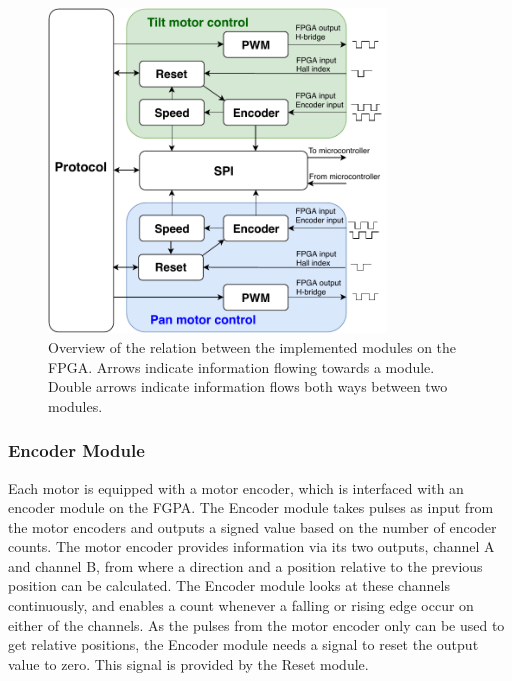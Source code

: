 \documentclass[../../main.tex]{subfiles}
\begin{document}
\begin{figure}
    \centering
    \includegraphics[width=0.8\textwidth]{Sections/System_Implementation/Images/FPGALogicBothMotors.pdf}
    \caption{Overview of the relation between the implemented modules on the FPGA. Arrows indicate information flowing towards a module. Double arrows indicate information flows both ways between two modules.}
    \label{fig:FPGALogicBothMotors}
\end{figure}




\subsubsection*{Encoder Module}

Each motor is equipped with a motor encoder, which is interfaced with an encoder module on the FGPA. The Encoder module takes pulses as input from the motor encoders and outputs a signed value based on the number of encoder counts. The motor encoder provides information via its two outputs, channel A and channel B, from where a direction and a position relative to the previous position can be calculated. The Encoder module looks at these channels continuously, and enables a count whenever a falling or rising edge occur on either of the channels. As the pulses from the motor encoder only can be used to get relative positions, the Encoder module needs a signal to reset the output value to zero. This signal is provided by the Reset module. 
\end{document}
